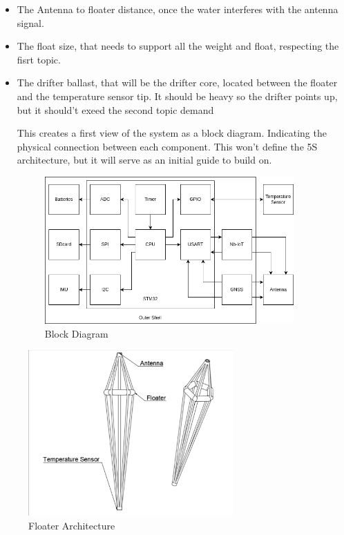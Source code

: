 \begin{itemize}
    \item The Antenna to floater distance, once the water interferes with the antenna signal.
    \item The float size, that needs to support all the weight and float, respecting the fisrt topic.
    \item The drifter ballast, that will be the drifter core, located between the 
    floater and the temperature sensor tip. It should be heavy so the drifter points up, but it should't exeed the 
    second topic demand 

This creates a first view of the system as a block diagram. Indicating the physical 
connection between each component. This won't define the 5S architecture, but it will serve
as an initial guide to build on.

\begin{figure}[H]
    \centering
    \includegraphics[width=0.9\textwidth]{images/diagrams/block_diagram/block_diagram_2/block_diagram.png}  %
    \caption{Block Diagram}
    \label{fig:Block Diagram}        
\end{figure}




\end{itemize}
\begin{figure}[H]
    \centering
    \includegraphics[width=0.7\textwidth]{images/diagrams/shell/unnamed.png}  %
    \caption{Floater Architecture}
    \label{fig:Floater Architecture}        
\end{figure}

